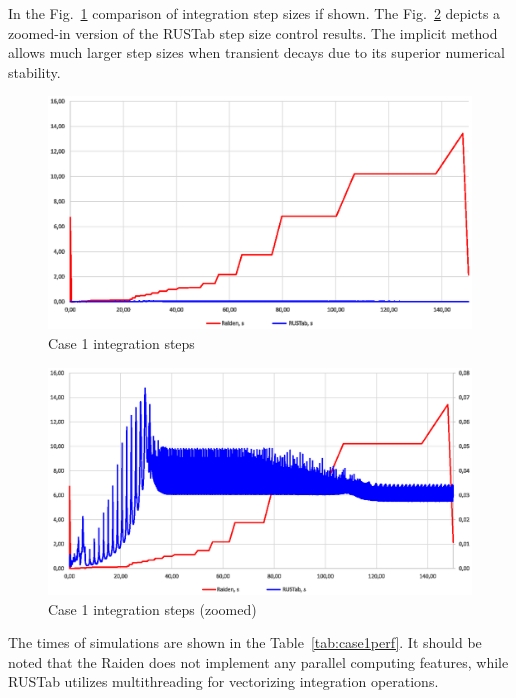 \documentclass[lettersize,journal]{IEEEtran}
\begin{document}
In the Fig.~\ref{case1step} comparison of integration step sizes if shown. The Fig.~\ref{case1stepz} depicts a zoomed-in version of the RUSTab step size control results.
The implicit method allows much larger step sizes when transient decays due to its superior numerical stability.


\begin{figure}[htbp]
	\centering
	\includegraphics[width=.8\columnwidth]{case1step.eps}
	\caption{Case 1 integration steps}
	\label{case1step}
\end{figure}

\begin{figure}[htbp]
	\centering
	\includegraphics[width=.8\columnwidth]{case1stepz.eps}
	\caption{Case 1 integration steps (zoomed)}
	\label{case1stepz}
\end{figure}

The times of simulations are shown in the Table~\ref{tab:case1perf}.   It should be noted that the Raiden does not implement any parallel computing features, while RUSTab utilizes multithreading for vectorizing integration operations. 
\end{document}
